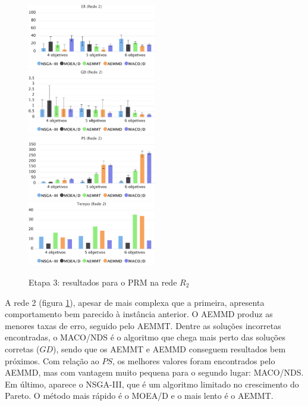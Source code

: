\begin{figure}[!htbp]
	\caption{Etapa 3: resultados para o PRM na rede $R_2$}
	\label{fig_exp3_prm_r2}
	\includegraphics[width=0.5\textwidth]{cap_experimentos/figs/etapa3/er-mrp-r2}
	\includegraphics[width=0.5\textwidth]{cap_experimentos/figs/etapa3/gd-mrp-r2}
	\includegraphics[width=0.5\textwidth]{cap_experimentos/figs/etapa3/ps-mrp-r2}
	\includegraphics[width=0.5\textwidth]{cap_experimentos/figs/etapa3/time-mrp-r2}
\end{figure}

A rede 2 (figura \ref{fig_exp3_prm_r2}), apesar de mais complexa que a primeira, apresenta comportamento bem parecido à instância anterior. O AEMMD produz as menores taxas de erro, seguido pelo AEMMT. Dentre as soluções incorretas encontradas, o MACO/NDS é o algoritmo que chega mais perto das soluções corretas ($GD$), sendo que os AEMMT e AEMMD conseguem resultados bem próximos. Com relação ao $PS$, os melhores valores foram encontrados pelo AEMMD, mas com vantagem muito pequena para o segundo lugar: MACO/NDS. Em último, aparece o NSGA-III, que é um algoritmo limitado no crescimento do Pareto. O método mais rápido é o MOEA/D e o mais lento é o AEMMT.

